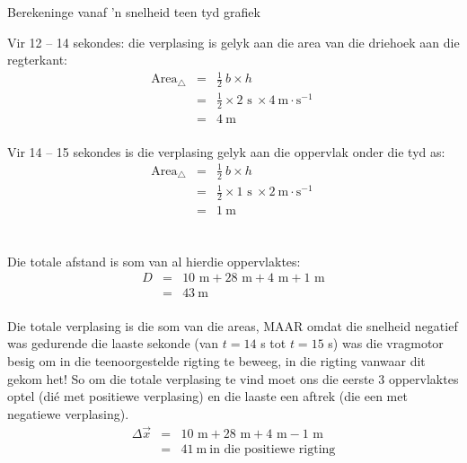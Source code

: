 \begin{wex}{Berekeninge vanaf 'n snelheid teen tyd grafiek}
{\begin{minipage}{0.4\textwidth}
Vir 12 -- 14 sekondes: die verplasing is gelyk aan die area van die driehoek aan die regterkant:
\begin{eqnarray*}
\text{Area}_{\triangle} &=& \frac{1}{2}~b \times h\\
&=& \frac{1}{2} \times 2\text{~s}\ \times 4 ~\text{m}\cdot \text{s}^{-1} \ \\
&=&4\ \text{m}\\
\end{eqnarray*}
\end{minipage}
\begin{minipage}{0.05\textwidth}
\begin{center}
\end{center}
\end{minipage}
\begin{minipage}{0.4\textwidth}
Vir 14 -- 15 sekondes is die verplasing gelyk aan die oppervlak onder die tyd as:
\begin{eqnarray*}
\text{Area}_{\triangle} &=& \frac{1}{2}~b \times h\\
&=& \frac{1}{2} \times 1\text{~s}\ \times 2 ~\text{m}\cdot \text{s}^{-1}\ \\
&=&1\ \text{m}\\
\end{eqnarray*}
\end{minipage}
\\
Die totale afstand is som van al hierdie oppervlaktes:
\begin{eqnarray*}
D&=&10\text{~m} + 28\text{~m} + 4\text{~m} + 1\text{~m}\\
&=&43\ \text{m}
\end{eqnarray*}
\\
Die totale verplasing is die som van die areas, MAAR omdat die snelheid negatief was gedurende die laaste sekonde (van $t=14$ s tot $t=15$ s) was die vragmotor besig om in die teenoorgestelde rigting te beweeg, in die rigting vanwaar dit gekom het! So om die totale verplasing te vind moet ons die eerste 3 oppervlaktes optel (di\'e met positiewe verplasing) en die laaste een aftrek (die een met negatiewe verplasing).
\begin{eqnarray*}
\Delta \vec{x}&=&10\text{~m} +28\text{~m} +4\text{~m} -1\text{~m}\\
&=&41\ \text{m}\ \mbox{in die positiewe rigting}
\end{eqnarray*}
}
\end{wex}

